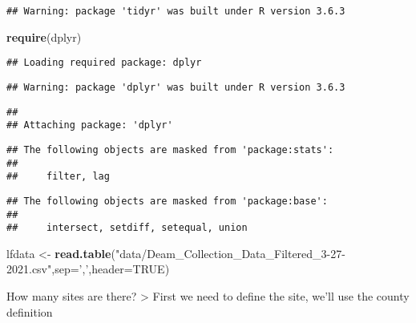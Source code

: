 \documentclass[
]{article}
\newenvironment{Shaded}{\begin{snugshade}}{\end{snugshade}}
\newcommand{\DataTypeTok}[1]{\textcolor[rgb]{0.13,0.29,0.53}{#1}}
\newcommand{\KeywordTok}[1]{\textcolor[rgb]{0.13,0.29,0.53}{\textbf{#1}}}
\newcommand{\NormalTok}[1]{#1}
\newcommand{\OperatorTok}[1]{\textcolor[rgb]{0.81,0.36,0.00}{\textbf{#1}}}
\newcommand{\OtherTok}[1]{\textcolor[rgb]{0.56,0.35,0.01}{#1}}
\newcommand{\StringTok}[1]{\textcolor[rgb]{0.31,0.60,0.02}{#1}}
\begin{document}
\begin{verbatim}
## Warning: package 'tidyr' was built under R version 3.6.3
\end{verbatim}

\begin{Shaded}
\begin{Highlighting}[]
\KeywordTok{require}\NormalTok{(dplyr)}
\end{Highlighting}
\end{Shaded}

\begin{verbatim}
## Loading required package: dplyr
\end{verbatim}

\begin{verbatim}
## Warning: package 'dplyr' was built under R version 3.6.3
\end{verbatim}

\begin{verbatim}
## 
## Attaching package: 'dplyr'
\end{verbatim}

\begin{verbatim}
## The following objects are masked from 'package:stats':
## 
##     filter, lag
\end{verbatim}

\begin{verbatim}
## The following objects are masked from 'package:base':
## 
##     intersect, setdiff, setequal, union
\end{verbatim}

\begin{Shaded}
\begin{Highlighting}[]
\NormalTok{lfdata <-}\StringTok{ }\KeywordTok{read.table}\NormalTok{(}\StringTok{"data/Deam_Collection_Data_Filtered_3-27-2021.csv"}\NormalTok{,}\DataTypeTok{sep=}\StringTok{','}\NormalTok{,}\DataTypeTok{header=}\OtherTok{TRUE}\NormalTok{)}
\end{Highlighting}
\end{Shaded}

How many sites are there? \textgreater{} First we need to define the
site, we'll use the county definition

\begin{Shaded}
\end{Shaded}
\end{document}
